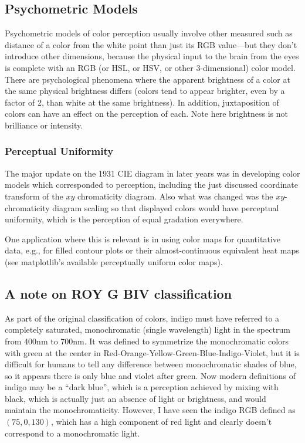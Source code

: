 \documentclass{article}
\begin{document}
\subsection{Psychometric Models}

Psychometric models of color perception usually involve other measured such as
distance of a color from the white point than just its RGB value---but they
don't introduce other dimensions, because the physical input to the brain from
the eyes is complete with an RGB (or HSL, or HSV, or other 3-dimensional)
color model. There are psychological phenomena where the apparent brightness of a
color at the same physical brightness differs (colors tend to appear brighter,
even by a factor of 2, than white at the same brightness). In addition,
juxtaposition of colors can have an effect on the perception of each. Note here
brightness is not brilliance or intensity.

\subsubsection{Perceptual Uniformity}

The major update on the 1931 CIE diagram in later years was in developing color
models which corresponded to perception, including the just discussed
coordinate transform of the $xy$ chromaticity diagram. Also what was changed
was the $xy$-chromaticity diagram scaling so that displayed colors would have
perceptual uniformity, which is the perception of equal gradation everywhere. 

One application where this is relevant is in using color maps for quantitative
data, e.g., for filled contour plots or their almost-continuous equivalent heat
maps (see matplotlib's available perceptually uniform color maps).

\subsection{A note on ROY G BIV classification}

As part of the original classification of colors, indigo must have referred to
a completely saturated, monochromatic (single wavelength) light in the spectrum
from 400nm to 700nm. It was defined to symmetrize the monochromatic colors with
green at the center in Red-Orange-Yellow-Green-Blue-Indigo-Violet, but it is
difficult for humans to tell any difference between monochromatic shades of
blue, so it appears there is only blue and violet after green. Now modern
definitions of indigo may be a \enquote{dark blue}, which is a perception
achieved by mixing with black, which is actually just an absence of light or
brightness, and would maintain the monochromaticity. However, I have seen
the indigo RGB defined as $(75,0,130)$, which has a high component of
red light and clearly doesn't correspond to a monochromatic light.
\end{document}
